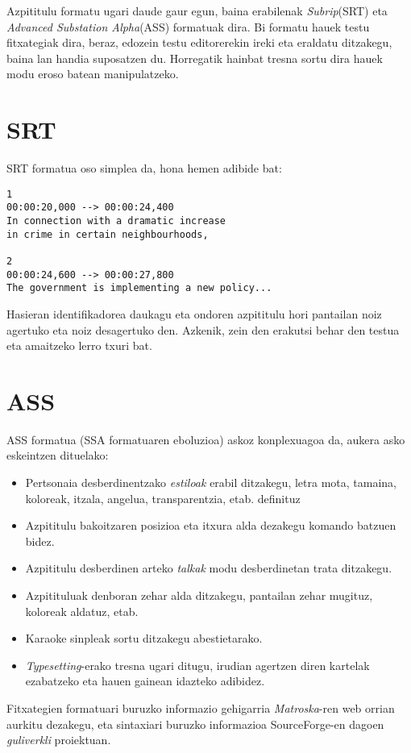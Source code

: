 
Azpititulu formatu ugari daude gaur egun, baina erabilenak \textit{Subrip}(SRT) eta \textit{Advanced Substation Alpha}(ASS) formatuak dira. Bi formatu hauek testu fitxategiak dira, beraz, edozein testu editorerekin ireki eta eraldatu ditzakegu, baina lan handia suposatzen du. Horregatik hainbat tresna sortu dira hauek modu eroso batean manipulatzeko.

\section{SRT}
SRT formatua oso simplea da, hona hemen adibide bat:
\begin{verbatim}
1
00:00:20,000 --> 00:00:24,400
In connection with a dramatic increase
in crime in certain neighbourhoods,

2
00:00:24,600 --> 00:00:27,800
The government is implementing a new policy...
\end{verbatim}

Hasieran identifikadorea daukagu eta ondoren azpititulu hori pantailan noiz agertuko eta noiz desagertuko den. Azkenik, zein den erakutsi behar den testua eta amaitzeko lerro txuri bat.

\section{ASS}
ASS formatua (SSA formatuaren eboluzioa) askoz konplexuagoa da, aukera asko eskeintzen dituelako:

\begin{itemize}
\item Pertsonaia desberdinentzako \textit{estiloak} erabil ditzakegu, letra mota, tamaina, koloreak, itzala, angelua, transparentzia, etab. definituz
\item Azpititulu bakoitzaren posizioa eta itxura alda dezakegu komando batzuen bidez.
\item Azpititulu desberdinen arteko \textit{talkak} modu desberdinetan trata ditzakegu.
\item Azpitituluak denboran zehar alda ditzakegu, pantailan zehar mugituz, koloreak aldatuz, etab.
\item Karaoke sinpleak sortu ditzakegu abestietarako.
\item \textit{Typesetting}-erako tresna ugari ditugu, irudian agertzen diren kartelak ezabatzeko eta hauen gainean idazteko adibidez.
\end{itemize}

Fitxategien formatuari buruzko informazio gehigarria \textit{Matroska}-ren web orrian\cite{ma:ass} aurkitu dezakegu, eta sintaxiari buruzko informazioa SourceForge-en dagoen \textit{guliverkli} proiektuan\cite{gu:ass}.
